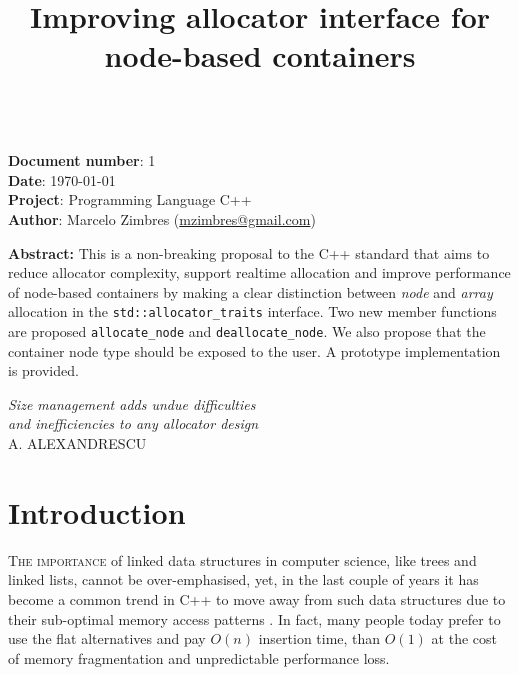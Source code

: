 \documentclass[11pt]{article}
\begin{document}
\date{}
\title{\vspace{-2cm} \bf Improving allocator interface for node-based containers}
\maketitle
\noindent
\vspace{-1cm} \\
{\bf Document number}:  1 \\
{\bf Date}:  \today \\
{\bf Project}: Programming Language C++ \\
{\bf Author}: Marcelo Zimbres (\href{mailto:mzimbres@gmail.com}{mzimbres@gmail.com}) 

\vspace{1cm}

\noindent
{\bf Abstract: }This is a non-breaking proposal to the C++ standard that aims
to reduce allocator complexity, support realtime allocation and improve
performance of node-based containers by making a clear distinction between {\it node}
and {\it array} allocation in the \texttt{std::allocator\_traits} interface.
Two new member functions are proposed \texttt{allocate\_node} and
\texttt{deallocate\_node}. We also propose that the container node type should
be exposed to the user. A prototype implementation is provided.

\tableofcontents

\vfill
\begin{flushright}
\noindent
{\it Size management adds undue difficulties \\
     and inefficiencies to any allocator design} \\
A. ALEXANDRESCU \\
\medskip
{\it }
\end{flushright}
\medskip

\section{Introduction}
\textsc{The importance} of linked data structures in computer science, like
trees and linked lists, cannot be over-emphasised, yet, in the last couple of
years it has become a common trend in C++ to move away from such data
structures due to their sub-optimal memory access patterns \cite{middleditch,
chandler, meyers}.  In fact, many people today prefer to use the flat
alternatives and pay $O(n)$ insertion time, than $O(1)$ at the cost of memory
fragmentation and unpredictable performance loss.  
\end{document}
